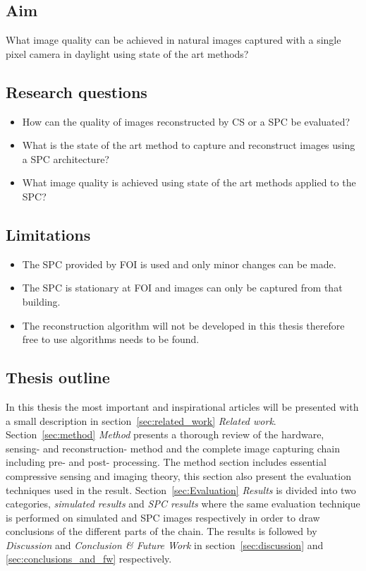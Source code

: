 \subsection{Aim} 
What image quality can be achieved in natural images captured with a single pixel camera in daylight using state of the art methods?  


\subsection{Research questions} 
\label{sec:RQ}
\begin{itemize}
    \item How can the quality of images reconstructed by CS or a SPC be evaluated?
    \item What is the state of the art method to capture and reconstruct images using a SPC architecture?
    \item What image quality is achieved using state of the art methods applied to the SPC?
\end{itemize}

\subsection{Limitations}
\begin{itemize}
    \item The SPC provided by FOI is used and only minor changes can be made.
    \item The SPC is stationary at FOI and images can only be captured from that building.
    \item The reconstruction algorithm will not be developed in this thesis therefore free to use algorithms needs to be found.
\end{itemize}



\subsection{Thesis outline}
In this thesis the most important and inspirational articles will be presented with a small description in section~\ref{sec:related_work} \textit{Related work}. Section~\ref{sec:method} \textit{Method} presents a thorough review of the hardware, sensing- and reconstruction- method and the complete image capturing chain including pre- and post- processing. The method section includes essential compressive sensing and imaging theory, this section also present the evaluation techniques used in the result. Section~\ref{sec:Evaluation} \textit{Results} is divided into two categories, \textit{simulated results} and \textit{SPC results} where the same evaluation technique is performed on simulated and SPC images respectively in order to draw conclusions of the different parts of the chain. The results is followed by \textit{Discussion} and \textit{Conclusion \& Future Work} in section~\ref{sec:discussion} and \ref{sec:conclusions_and_fw} respectively. 
